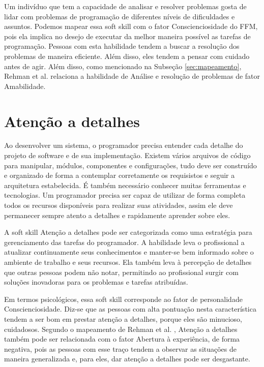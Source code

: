 Um indivíduo que tem a capacidade de analisar e resolver problemas gosta de lidar com problemas de programação de diferentes níveis de dificuldades e assuntos.
Podemos mapear essa soft skill com o fator Conscienciosidade do FFM, pois ela implica no desejo de executar da melhor maneira possível as tarefas de programação. Pessoas com esta habilidade tendem a buscar a resolução dos problemas de maneira eficiente. Além disso, eles tendem a pensar com cuidado antes de agir. Além disso, como mencionado na Subseção \ref{sec:mapeamento}, Rehman et al. \cite{rehman:12} relaciona a habilidade de Análise e resolução de problemas de fator Amabilidade.

\section{Atenção a detalhes}

Ao desenvolver um sistema, o programador precisa entender cada detalhe do projeto de software e de sua implementação. Existem vários arquivos de código para manipular, módulos, componentes e configurações, tudo deve ser construído e organizado de forma a contemplar corretamente os requisistos e seguir a arquitetura estabelecida. É também necessário conhecer muitas ferramentas e tecnologias. Um programador precisa ser capaz de utilizar de forma completa todos os recursos disponíveis para realizar suas atividades, assim ele deve permanecer sempre atento a detalhes e rapidamente aprender sobre eles.

A soft skill Atenção a detalhes pode ser categorizada como uma estratégia para gerenciamento das tarefas do programador. A habilidade leva o profissional a atualizar continuamente seus conhecimentos e manter-se bem informado sobre o ambiente de trabalho e seus recursos. Ela também leva à percepção de detalhes que outras pessoas podem não notar, permitindo ao profissional surgir com soluções inovadoras para os problemas e tarefas atribuídas.

Em termos psicológicos, essa soft skill corresponde ao fator de personalidade Conscienciosidade. Diz-se que as pessoas com alta pontuação nesta característica tendem a ser bom em prestar atenção a detalhes, porque eles são minucioso, cuidadosos. Segundo o mapeamento de Rehman et al. \cite{rehman:12}, Atenção a detalhes também pode ser relacionada com o fator Abertura à experiência, de forma negativa, pois as pessoas com esse traço tendem a observar as situações de maneira generalizada e, para eles, dar atenção a detalhes pode ser desgastante.

